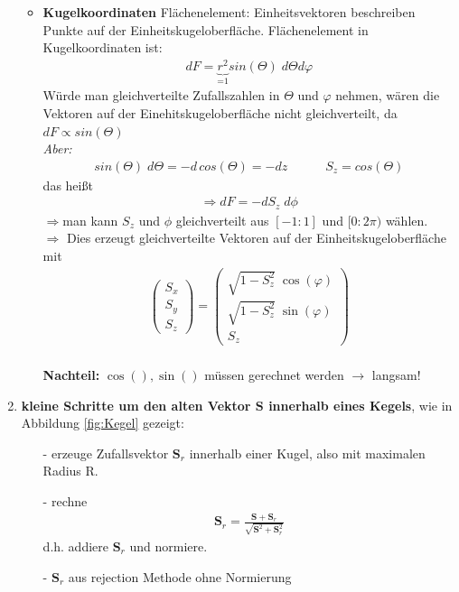 \documentclass[12pt]{article}
\begin{document}
\begin{enumerate}
\begin{itemize}
			\item \textbf{Kugelkoordinaten} Flächenelement:
			Einheitsvektoren beschreiben Punkte auf der Einheitskugeloberfläche. Flächenelement in Kugelkoordinaten ist:
			\begin{align}
			dF= \underbrace{r^2}_\text{=1} sin(\Theta) \; d \Theta d\varphi
			\end{align}	
			Würde man gleichverteilte Zufallszahlen in $\Theta$ und $\varphi$ nehmen, wären die Vektoren auf der Einehitskugeloberfläche nicht gleichverteilt, da $dF \propto sin(\Theta)$ \\
			\textit{Aber:} 
			\begin{align*}
			sin(\Theta) \; d\Theta = - d \, cos(\Theta) = -dz \quad \quad \quad S_z =cos(\Theta)
			\end{align*}
			das heißt 
			\begin{align*}
			\Rightarrow dF= - d S_z \; d \phi 
			\end{align*}
			$ \Rightarrow$man kann $S_z$ und $\phi$ gleichverteilt aus $[-1:1]$ und $[0:2\pi)$ wählen. \\
			$\Rightarrow$ Dies erzeugt gleichverteilte Vektoren auf der Einheitskugeloberfläche mit
\begin{align*}
 \begin{pmatrix} S_x \\ S_y \\ S_z \end{pmatrix} =  \begin{pmatrix} \sqrt{1-S_z^2} \; \cos(\varphi) \\ \sqrt{1-S_z^2} \; \sin(\varphi) \\ S_z \end{pmatrix}
\end{align*}
			\\ 
\textbf{Nachteil:} $\cos(),\sin()$ müssen gerechnet werden $\to$ langsam!			
\end{itemize}
			
			
			\item \textbf{ kleine Schritte um den alten Vektor $\mathbf{S}$ innerhalb eines Kegels}, wie in Abbildung \ref{fig:Kegel} gezeigt:
			\begin{itemize}
			\item[-] erzeuge Zufallsvektor $\mathbf{S}_r$ innerhalb einer Kugel, also mit maximalen Radius R.
			\item[-] rechne 
			\begin{align}
			\mathbf{S}_r = \frac{\mathbf{S} + \mathbf{S}_r}{\sqrt{\mathbf{S}^2 + \mathbf{S}_r^2}}
			\end{align} d.h. addiere $\mathbf{S}_r$ und normiere.
			\item[-] $\mathbf{S}_r$ aus rejection Methode ohne Normierung
			\end{itemize}
			

\end{enumerate}
\end{document}
